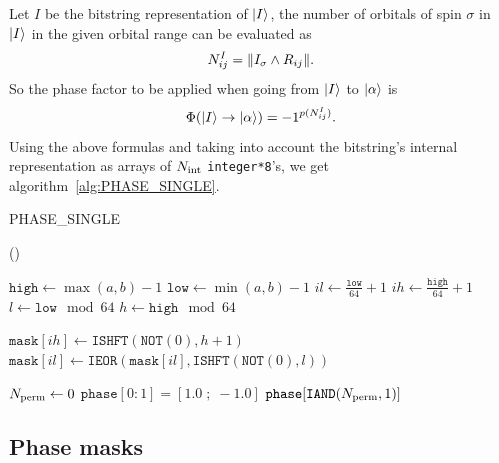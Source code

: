 \documentclass[./thesis.tex]{subfiles}
\begin{document}
Let $I$ be the bitstring representation of ${\ket{I}}$, the number of orbitals of spin $\sigma$ in ${\ket{I}}$ in the given orbital range can be evaluated as
\begin{equation}
N^{I}_{ij} = \norm{I_{\sigma} \wedge R_{ij}}.
\end{equation}
So the phase factor to be applied when going from ${\ket{I}}$ to ${\ket{\alpha}}$ is 
\begin{equation}
{\Phi \qty({\ket{I}}\rightarrow {\ket{\alpha}})} = -1^{p(N^I_{ij})}.
\end{equation}
Using the above formulas and taking into account the bitstring's internal representation as arrays of ${N_\text{int}}$ \lstinline{integer*8}'s, we get algorithm~\ref{alg:PHASE_SINGLE}.   


\begin{algorithm}
	\caption{PHASE\_SINGLE}	
	\label{alg:PHASE_SINGLE}
	
	\Fn(){}{
		$\texttt{high} \gets \max(a,b)-1$ \;
		$\texttt{low} \gets \min(a,b)-1$ \;
		$il \gets \frac{\texttt{low}}{64} + 1$ \;
		$ih \gets \frac{\texttt{high}}{64} + 1$ \;
		$l \gets \texttt{low} \mod 64$ \;
		$h \gets \texttt{high} \mod 64$ \; 

		
		$\texttt{mask}[ih] \gets \texttt{ISHFT}(\texttt{NOT}(0), h+1)$ \;
		$\texttt{mask}[il] \gets \texttt{IEOR}(\texttt{mask}[il], \texttt{ISHFT}(\texttt{NOT}(0), l))$ \;
		
		
		${N_\text{perm}} \gets 0$ \;
                $\texttt{phase}[0:1] = [ 1.0 \;;\; -1.0 ]$ \;
                \KwRet $\texttt{phase}[\texttt{IAND}({N_\text{perm}},1)]$ \;
		}
\end{algorithm}


\subsection{Phase masks}
\label{chap:PHASEMASK}
\end{document}

